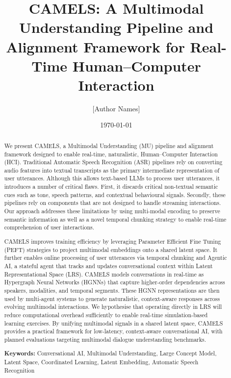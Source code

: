 \documentclass[12pt, a4paper]{article}
\title{\textbf{CAMELS: A Multimodal Understanding Pipeline and Alignment Framework for Real-Time Human--Computer Interaction}}
\author{[Author Names]}
\date{\today}
\begin{document}
\maketitle

\begin{abstract}
We present CAMELS, a Multimodal Understanding (MU) pipeline and alignment framework designed to enable real-time, naturalistic, Human--Computer Interaction (HCI). Traditional Automatic Speech Recognition (ASR) pipelines rely on converting audio features into textual transcripts as the primary intermediate representation of user utterances. Although this allows text-based LLMs to process user utterances, it introduces a number of critical flaws. First, it discards critical non-textual semantic cues such as tone, speech patterns, and contextual behavioural signals. Secondly, these pipelines rely on components that are not designed to handle streaming interactions. Our approach addresses these limitations by using multi-modal encoding to preserve semantic information as well as a novel temporal chunking strategy to enable real-time comprehension of user interactions.

CAMELS improves training efficiency by leveraging Parameter Efficient Fine Tuning (PEFT) strategies to project multimodal embeddings onto a shared latent space. It further enables online processing of user utterances via temporal chunking and Agentic AI, a stateful agent that tracks and updates conversational context within Latent Representational Space (LRS). CAMELS models conversations in real-time as Hypergraph Neural Networks (HGNNs) that capture higher-order dependencies across speakers, modalities, and temporal segments. These HGNN representations are then used by multi-agent systems to generate naturalistic, context-aware responses across evolving multimodal interactions. We hypothesise that operating directly in LRS will reduce computational overhead sufficiently to enable real-time simulation-based learning exercises. By unifying multimodal signals in a shared latent space, CAMELS provides a practical framework for low-latency, context-aware conversational AI, with planned evaluations targeting multimodal dialogue understanding benchmarks.

\textbf{Keywords:} Conversational AI, Multimodal Understanding, Large Concept Model, Latent Space, Coordinated Learning, Latent Embedding, Automatic Speech Recognition
\end{abstract}
\end{document}
